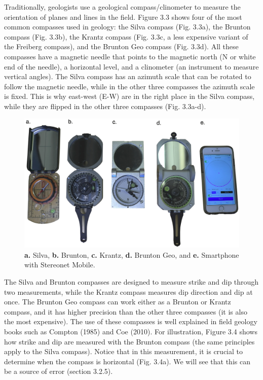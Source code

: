\documentclass[a4paper , 12pt]{book}
\begin{document}
Traditionally, geologists use a geological compass/clinometer to measure the orientation of planes and lines in the field. Figure 3.3 shows four of the most common compasses used in geology: the Silva compass (Fig. 3.3a), the Brunton compass (Fig. 3.3b), the Krantz compass (Fig. 3.3c, a less expensive variant of the Freiberg compass), and the Brunton Geo compass (Fig. 3.3d). All these compasses have a magnetic needle that points  to the magnetic north (N or white end of the needle), a horizontal level, and a clinometer (an instrument to measure vertical angles). The Silva compass has an azimuth scale that can be rotated to follow the magnetic needle, while in the other three compasses the azimuth scale is fixed. This is why east-west (E-W) are in the right place in the Silva compass, while they are flipped in the other three compasses (Fig. 3.3a-d).

\begin{figure}[ht]
    \centering
    \includegraphics[width=13cm]{Figures/ch3f3.png}
    \caption{\textbf{a.} Silva, \textbf{b.} Brunton, \textbf{c.} Krantz, \textbf{d.} Brunton Geo, and \textbf{e.} Smartphone with Stereonet Mobile.}
\end{figure}

The Silva and Brunton compasses are designed to measure strike and dip through two measurements, while the Krantz compass measures dip direction and dip at once. The Brunton Geo compass can work either as a Brunton or Krantz compass, and it has higher precision than the other three compasses (it is also the most expensive). The use of these compasses is well explained in field geology books such as Compton (1985) and Coe (2010). For illustration, Figure 3.4 shows how strike and dip are measured with the Brunton compass (the same principles apply to the Silva compass). Notice that in this measurement, it is crucial to determine when the compass is horizontal (Fig. 3.4a). We will see that this can be a source of error (section 3.2.5).
\end{document}
